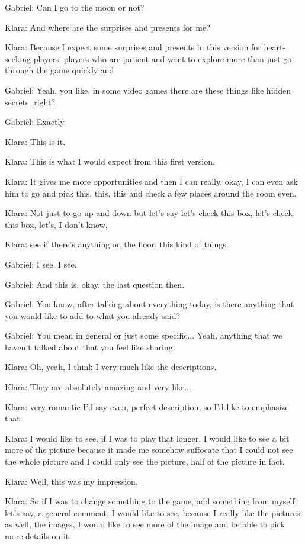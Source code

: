 Gabriel: Can I go to the moon or not?

Klara: And where are the surprises and presents for me?

Klara: Because I expect some surprises and presents in this version for heart-seeking players, players who are patient and want to explore more than just go through the game quickly and

Gabriel: Yeah, you like, in some video games there are these things like hidden secrets, right?

Gabriel: Exactly.

Klara: This is it.

Klara: This is what I would expect from this first version.

Klara: It gives me more opportunities and then I can really, okay, I can even ask him to go and pick this, this, this and check a few places around the room even.

Klara: Not just to go up and down but let's say let's check this box, let's check this box, let's, I don't know,

Klara: see if there's anything on the floor, this kind of things.

Gabriel: I see, I see.

Gabriel: And this is, okay, the last question then.

Gabriel: You know, after talking about everything today, is there anything that you would like to add to what you already said?

Gabriel: You mean in general or just some specific... Yeah, anything that we haven't talked about that you feel like sharing.

Klara: Oh, yeah, I think I very much like the descriptions.

Klara: They are absolutely amazing and very like...

Klara: very romantic I'd say even, perfect description, so I'd like to emphasize that.

Klara: I would like to see, if I was to play that longer, I would like to see a bit more of the picture because it made me somehow suffocate that I could not see the whole picture and I could only see the picture, half of the picture in fact.

Klara: Well, this was my impression.

Klara: So if I was to change something to the game, add something from myself, let's say, a general comment, I would like to see, because I really like the pictures as well, the images, I would like to see more of the image and be able to pick more details on it.

